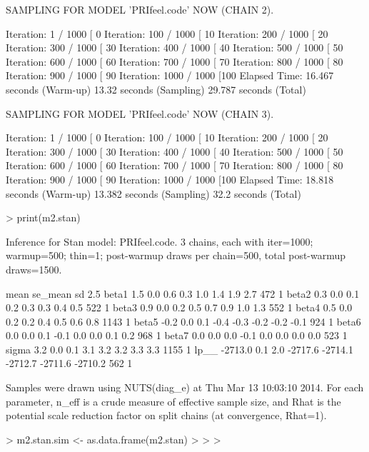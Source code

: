 \documentclass[12pt]{article}
\begin{document}
\begin{enumerate}
\begin{Schunk}
\begin{Soutput}
SAMPLING FOR MODEL 'PRIfeel.code' NOW (CHAIN 2).

Iteration:   1 / 1000 [  0%
Iteration: 100 / 1000 [ 10%
Iteration: 200 / 1000 [ 20%
Iteration: 300 / 1000 [ 30%
Iteration: 400 / 1000 [ 40%
Iteration: 500 / 1000 [ 50%
Iteration: 600 / 1000 [ 60%
Iteration: 700 / 1000 [ 70%
Iteration: 800 / 1000 [ 80%
Iteration: 900 / 1000 [ 90%
Iteration: 1000 / 1000 [100%
Elapsed Time: 16.467 seconds (Warm-up)
              13.32 seconds (Sampling)
              29.787 seconds (Total)

SAMPLING FOR MODEL 'PRIfeel.code' NOW (CHAIN 3).

Iteration:   1 / 1000 [  0%
Iteration: 100 / 1000 [ 10%
Iteration: 200 / 1000 [ 20%
Iteration: 300 / 1000 [ 30%
Iteration: 400 / 1000 [ 40%
Iteration: 500 / 1000 [ 50%
Iteration: 600 / 1000 [ 60%
Iteration: 700 / 1000 [ 70%
Iteration: 800 / 1000 [ 80%
Iteration: 900 / 1000 [ 90%
Iteration: 1000 / 1000 [100%
Elapsed Time: 18.818 seconds (Warm-up)
              13.382 seconds (Sampling)
              32.2 seconds (Total)
\end{Soutput}
\begin{Sinput}
> print(m2.stan)
\end{Sinput}
\begin{Soutput}
Inference for Stan model: PRIfeel.code.
3 chains, each with iter=1000; warmup=500; thin=1; 
post-warmup draws per chain=500, total post-warmup draws=1500.

         mean se_mean  sd    2.5%
beta1     1.5     0.0 0.6     0.3     1.0     1.4     1.9     2.7   472    1
beta2     0.3     0.0 0.1     0.2     0.3     0.3     0.4     0.5   522    1
beta3     0.9     0.0 0.2     0.5     0.7     0.9     1.0     1.3   552    1
beta4     0.5     0.0 0.2     0.2     0.4     0.5     0.6     0.8  1143    1
beta5    -0.2     0.0 0.1    -0.4    -0.3    -0.2    -0.2    -0.1   924    1
beta6     0.0     0.0 0.1    -0.1     0.0     0.0     0.1     0.2   968    1
beta7     0.0     0.0 0.0    -0.1     0.0     0.0     0.0     0.0   523    1
sigma     3.2     0.0 0.1     3.1     3.2     3.2     3.3     3.3  1155    1
lp__  -2713.0     0.1 2.0 -2717.6 -2714.1 -2712.7 -2711.6 -2710.2   562    1

Samples were drawn using NUTS(diag_e) at Thu Mar 13 10:03:10 2014.
For each parameter, n_eff is a crude measure of effective sample size,
and Rhat is the potential scale reduction factor on split chains (at 
convergence, Rhat=1).
\end{Soutput}
\begin{Sinput}
> m2.stan.sim <- as.data.frame(m2.stan)
> 
> 
> 
\end{Sinput}
\end{Schunk}


\end{enumerate}
\end{document}
